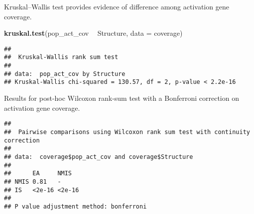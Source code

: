 \documentclass[]{book}
\newenvironment{Shaded}{\begin{snugshade}}{\end{snugshade}}
\newcommand{\DataTypeTok}[1]{\textcolor[rgb]{0.13,0.29,0.53}{#1}}
\newcommand{\KeywordTok}[1]{\textcolor[rgb]{0.13,0.29,0.53}{\textbf{#1}}}
\newcommand{\NormalTok}[1]{#1}
\newcommand{\OperatorTok}[1]{\textcolor[rgb]{0.81,0.36,0.00}{\textbf{#1}}}
\newcommand{\OtherTok}[1]{\textcolor[rgb]{0.56,0.35,0.01}{#1}}
\newcommand{\StringTok}[1]{\textcolor[rgb]{0.31,0.60,0.02}{#1}}
\begin{document}
Kruskal--Wallis test provides evidence of difference among activation gene coverage.

\begin{Shaded}
\begin{Highlighting}[]
\KeywordTok{kruskal.test}\NormalTok{(pop_act_cov }\OperatorTok{~}\StringTok{ }\NormalTok{Structure, }\DataTypeTok{data =}\NormalTok{ coverage)}
\end{Highlighting}
\end{Shaded}

\begin{verbatim}
## 
##  Kruskal-Wallis rank sum test
## 
## data:  pop_act_cov by Structure
## Kruskal-Wallis chi-squared = 130.57, df = 2, p-value < 2.2e-16
\end{verbatim}

Results for post-hoc Wilcoxon rank-sum test with a Bonferroni correction on activation gene coverage.

\begin{Shaded}
\end{Shaded}

\begin{verbatim}
## 
##  Pairwise comparisons using Wilcoxon rank sum test with continuity correction 
## 
## data:  coverage$pop_act_cov and coverage$Structure 
## 
##      EA     NMIS  
## NMIS 0.81   -     
## IS   <2e-16 <2e-16
## 
## P value adjustment method: bonferroni
\end{verbatim}


\end{document}
